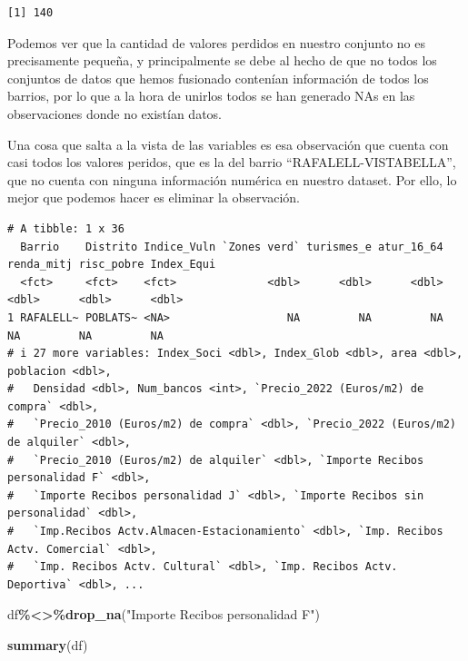 \documentclass[notspecified,article,submit,moreauthors,pdftex]{Definitions/mdpi}
\newenvironment{Shaded}{\begin{snugshade}}{\end{snugshade}}
\newcommand{\FunctionTok}[1]{\textcolor[rgb]{0.13,0.29,0.53}{\textbf{#1}}}
\newcommand{\NormalTok}[1]{#1}
\newcommand{\SpecialCharTok}[1]{\textcolor[rgb]{0.81,0.36,0.00}{\textbf{#1}}}
\newcommand{\StringTok}[1]{\textcolor[rgb]{0.31,0.60,0.02}{#1}}
\begin{document}
\begin{verbatim}
[1] 140
\end{verbatim}

Podemos ver que la cantidad de valores perdidos en nuestro conjunto no
es precisamente pequeña, y principalmente se debe al hecho de que no
todos los conjuntos de datos que hemos fusionado contenían información
de todos los barrios, por lo que a la hora de unirlos todos se han
generado NAs en las observaciones donde no existían datos.

Una cosa que salta a la vista de las variables es esa observación que
cuenta con casi todos los valores peridos, que es la del barrio
``RAFALELL-VISTABELLA'', que no cuenta con ninguna información numérica
en nuestro dataset. Por ello, lo mejor que podemos hacer es eliminar la
observación.

\begin{Shaded}
\end{Shaded}

\begin{verbatim}
# A tibble: 1 x 36
  Barrio    Distrito Indice_Vuln `Zones verd` turismes_e atur_16_64 renda_mitj risc_pobre Index_Equi
  <fct>     <fct>    <fct>              <dbl>      <dbl>      <dbl>      <dbl>      <dbl>      <dbl>
1 RAFALELL~ POBLATS~ <NA>                  NA         NA         NA         NA         NA         NA
# i 27 more variables: Index_Soci <dbl>, Index_Glob <dbl>, area <dbl>, poblacion <dbl>,
#   Densidad <dbl>, Num_bancos <int>, `Precio_2022 (Euros/m2) de compra` <dbl>,
#   `Precio_2010 (Euros/m2) de compra` <dbl>, `Precio_2022 (Euros/m2) de alquiler` <dbl>,
#   `Precio_2010 (Euros/m2) de alquiler` <dbl>, `Importe Recibos personalidad F` <dbl>,
#   `Importe Recibos personalidad J` <dbl>, `Importe Recibos sin personalidad` <dbl>,
#   `Imp.Recibos Actv.Almacen-Estacionamiento` <dbl>, `Imp. Recibos Actv. Comercial` <dbl>,
#   `Imp. Recibos Actv. Cultural` <dbl>, `Imp. Recibos Actv. Deportiva` <dbl>, ...
\end{verbatim}

\begin{Shaded}
\begin{Highlighting}[]
\NormalTok{df}\SpecialCharTok{\%\textless{}\textgreater{}\%}\FunctionTok{drop\_na}\NormalTok{(}\StringTok{"Importe Recibos personalidad F"}\NormalTok{)}

\FunctionTok{summary}\NormalTok{(df)}
\end{Highlighting}
\end{Shaded}
\end{document}
